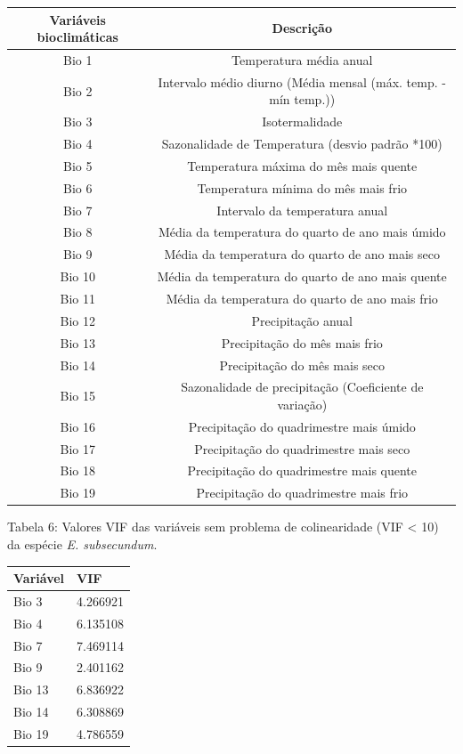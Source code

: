 \documentclass[
  11pt,
]{article}
\begin{document}
\begin{longtable}[]{@{}cc@{}}
\toprule
Variáveis bioclimáticas & Descrição \\
\midrule
\endhead
Bio 1 & Temperatura média anual \\
Bio 2 & Intervalo médio diurno (Média mensal (máx. temp. - mín
temp.)) \\
Bio 3 & Isotermalidade \\
Bio 4 & Sazonalidade de Temperatura (desvio padrão *100) \\
Bio 5 & Temperatura máxima do mês mais quente \\
Bio 6 & Temperatura mínima do mês mais frio \\
Bio 7 & Intervalo da temperatura anual \\
Bio 8 & Média da temperatura do quarto de ano mais úmido \\
Bio 9 & Média da temperatura do quarto de ano mais seco \\
Bio 10 & Média da temperatura do quarto de ano mais quente \\
Bio 11 & Média da temperatura do quarto de ano mais frio \\
Bio 12 & Precipitação anual \\
Bio 13 & Precipitação do mês mais frio \\
Bio 14 & Precipitação do mês mais seco \\
Bio 15 & Sazonalidade de precipitação (Coeficiente de variação) \\
Bio 16 & Precipitação do quadrimestre mais úmido \\
Bio 17 & Precipitação do quadrimestre mais seco \\
Bio 18 & Precipitação do quadrimestre mais quente \\
Bio 19 & Precipitação do quadrimestre mais frio \\
\bottomrule
\end{longtable}

\clearpage

Tabela 6: Valores VIF das variáveis sem problema de colinearidade (VIF
\textless{} 10) da espécie \emph{E. subsecundum}.

\begin{longtable}[]{@{}ll@{}}
\toprule
Variável & VIF \\
\midrule
\endhead
Bio 3 & 4.266921 \\
Bio 4 & 6.135108 \\
Bio 7 & 7.469114 \\
Bio 9 & 2.401162 \\
Bio 13 & 6.836922 \\
Bio 14 & 6.308869 \\
Bio 19 & 4.786559 \\
\bottomrule
\end{longtable}
\end{document}

